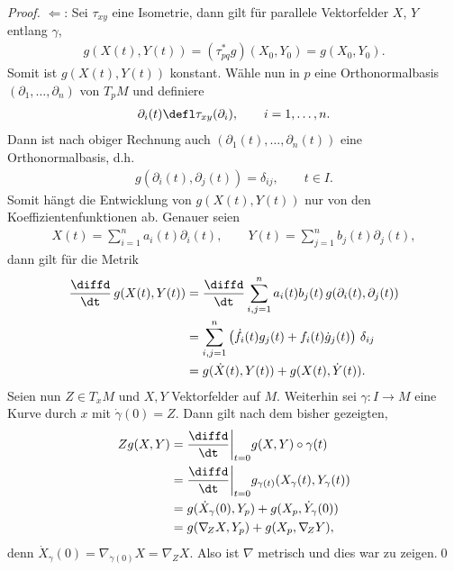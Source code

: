 \documentclass[%
	paper=a5,%
	fleqn,%
	DIV=18,%
	BCOR=0mm,
	fontsize=11pt,
	titlepage=false,%
	bibliography=totoc,
	DIV=18,%
	twoside=true,
	pdftitle=Riemannsche Geometrie,
	pdfauthor=Uwe Semmelmann,
	numbers=noendperiod]%
	{scrbook}
\begin{document}
\begin{proof}
$\Leftarrow$: Sei $\tau_{xy}$ eine Isometrie, dann gilt für parallele
Vektorfelder $X$, $Y$ entlang $\gamma$,
\begin{align*}
g(X(t),Y(t)) = (\tau_{pq}^*g)(X_0,Y_0) = g(X_0,Y_0).
\end{align*}
Somit ist $g(X(t),Y(t))$ konstant. Wähle nun in $p$ eine Orthonormalbasis
$(\partial_1,\ldots,\partial_n)$ von $T_pM$ und definiere
\begin{align*}
\partial_i(t) \defl \tau_{xy}(\partial_i),\qquad i=1,\ldots,n.
\end{align*}
Dann ist nach obiger Rechnung auch $(\partial_1(t),\ldots,\partial_n(t))$
eine Orthonormalbasis, d.h.
\begin{align*}
g(\partial_i(t),\partial_j(t)) = \delta_{ij},\qquad t\in I.
\end{align*}
Somit hängt die Entwicklung von $g(X(t),Y(t))$ nur von den
Koeffizientenfunktionen ab. Genauer seien
\begin{align*}
X(t) = \sum_{i=1}^n a_i(t) \partial_i(t),\qquad
Y(t) = \sum_{j=1}^n b_j(t) \partial_j(t),
\end{align*}
dann gilt für die Metrik
\begin{align*}
\frac{\diffd}{\dt}\, g(X(t),Y(t)) &= 
 \frac{\diffd}{\dt} \sum_{i,j=1}^n a_i(t) b_j(t)\,
 g(\partial_i(t),\partial_j(t))\\ 
 &= \sum_{i,j=1}^n \left(\dot{f}_i(t)g_j(t) + f_i(t)\dot
 g_j(t)\right)\,\delta_{ij}\\ 
 &= g(\dot{X}(t),Y(t)) + g(X(t),\dot Y(t)).
\end{align*}
Seien nun $Z\in T_xM$ und $X,Y$ Vektorfelder auf $M$. Weiterhin sei $\gamma
: I\to M$ eine Kurve durch $x$ mit $\dot{\gamma}(0) = Z$. Dann gilt nach dem
bisher gezeigten,
\begin{align*}
Z g(X,Y) &= \frac{\diffd}{\dt}\bigg|_{t=0} g(X,Y)\circ \gamma(t)\\
&= \frac{\diffd}{\dt}\bigg|_{t=0} g_{\gamma(t)}(X_\gamma(t),
Y_\gamma(t))\\
&= g(\dot{X}_\gamma(0),Y_p) + 
g(X_p,\dot{Y}_\gamma(0))\\
&= g(\nabla_{\!Z} X,Y_p) + 
g(X_p,\nabla_{\!Z} Y),
\end{align*}
denn $\dot{X}_\gamma(0) = \nabla_{\dot{\gamma}(0)}X = \nabla_Z X$. Also ist
$\nabla$ metrisch und dies war zu zeigen.\qed
\end{proof}
\end{document}
